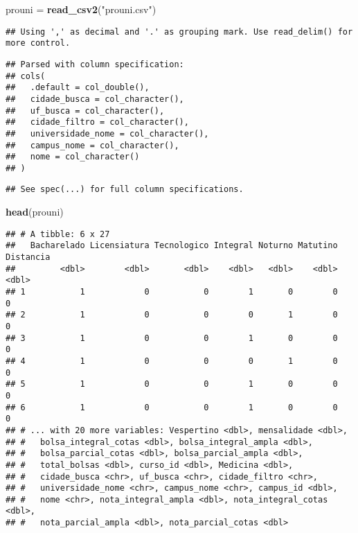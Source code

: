 \documentclass[]{article}
\newenvironment{Shaded}{\begin{snugshade}}{\end{snugshade}}
\newcommand{\KeywordTok}[1]{\textcolor[rgb]{0.13,0.29,0.53}{\textbf{#1}}}
\newcommand{\StringTok}[1]{\textcolor[rgb]{0.31,0.60,0.02}{#1}}
\newcommand{\NormalTok}[1]{#1}
\begin{document}
\begin{Shaded}
\begin{Highlighting}[]
\NormalTok{prouni =}\StringTok{ }\KeywordTok{read_csv2}\NormalTok{(}\StringTok{"prouni.csv"}\NormalTok{)}
\end{Highlighting}
\end{Shaded}

\begin{verbatim}
## Using ',' as decimal and '.' as grouping mark. Use read_delim() for more control.
\end{verbatim}

\begin{verbatim}
## Parsed with column specification:
## cols(
##   .default = col_double(),
##   cidade_busca = col_character(),
##   uf_busca = col_character(),
##   cidade_filtro = col_character(),
##   universidade_nome = col_character(),
##   campus_nome = col_character(),
##   nome = col_character()
## )
\end{verbatim}

\begin{verbatim}
## See spec(...) for full column specifications.
\end{verbatim}

\begin{Shaded}
\begin{Highlighting}[]
\KeywordTok{head}\NormalTok{(prouni)}
\end{Highlighting}
\end{Shaded}

\begin{verbatim}
## # A tibble: 6 x 27
##   Bacharelado Licensiatura Tecnologico Integral Noturno Matutino Distancia
##         <dbl>        <dbl>       <dbl>    <dbl>   <dbl>    <dbl>     <dbl>
## 1           1            0           0        1       0        0         0
## 2           1            0           0        0       1        0         0
## 3           1            0           0        1       0        0         0
## 4           1            0           0        0       1        0         0
## 5           1            0           0        1       0        0         0
## 6           1            0           0        1       0        0         0
## # ... with 20 more variables: Vespertino <dbl>, mensalidade <dbl>,
## #   bolsa_integral_cotas <dbl>, bolsa_integral_ampla <dbl>,
## #   bolsa_parcial_cotas <dbl>, bolsa_parcial_ampla <dbl>,
## #   total_bolsas <dbl>, curso_id <dbl>, Medicina <dbl>,
## #   cidade_busca <chr>, uf_busca <chr>, cidade_filtro <chr>,
## #   universidade_nome <chr>, campus_nome <chr>, campus_id <dbl>,
## #   nome <chr>, nota_integral_ampla <dbl>, nota_integral_cotas <dbl>,
## #   nota_parcial_ampla <dbl>, nota_parcial_cotas <dbl>
\end{verbatim}
\end{document}
